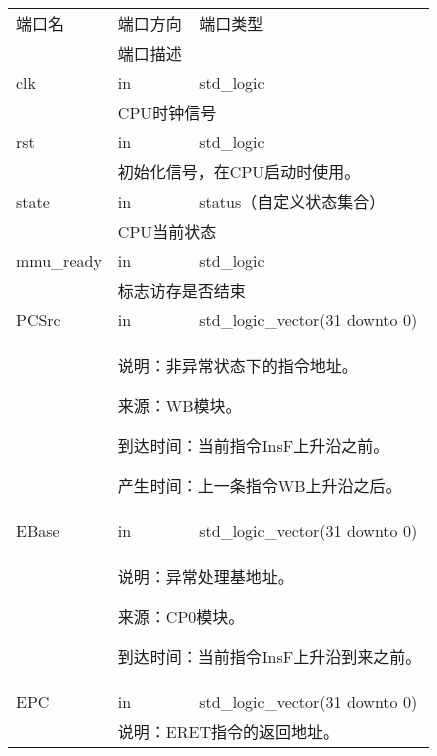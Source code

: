         \begin{tabularx}{\textwidth}{lll}
            \toprule
            端口名          & 端口方向  & 端口类型 \\
            \cmidrule(l){2-3}
            &
            \multicolumn{2}{X}{端口描述} \\
            \midrule
            clk             & in        & std\_logic \\
            \cmidrule(l){2-3}
            &
            \multicolumn{2}{X}{
                CPU时钟信号
            } \\
            \midrule
            rst             & in        & std\_logic \\
            \cmidrule(l){2-3}
            &
            \multicolumn{2}{X}{
                初始化信号，在CPU启动时使用。
            } \\
            \midrule
            state           & in        & status（自定义状态集合） \\
            \cmidrule(l){2-3}
            &
            \multicolumn{2}{X}{
                CPU当前状态
            } \\
            \midrule
            mmu\_ready           & in        & std\_logic \\
            \cmidrule(l){2-3}
            &
            \multicolumn{2}{X}{
                标志访存是否结束
            } \\
            \midrule
            PCSrc           & in        & std\_logic\_vector(31 downto 0) \\
            \cmidrule(l){2-3}
            &
            \multicolumn{2}{X}{
                说明：非异常状态下的指令地址。

                来源：WB模块。

                到达时间：当前指令InsF上升沿之前。

                产生时间：上一条指令WB上升沿之后。
            } \\
            \midrule
            EBase           & in        & std\_logic\_vector(31 downto 0) \\
            \cmidrule(l){2-3}
            &
            \multicolumn{2}{X}{
                说明：异常处理基地址。

                来源：CP0模块。

                到达时间：当前指令InsF上升沿到来之前。
            } \\
            \midrule
            EPC             & in        & std\_logic\_vector(31 downto 0) \\
            \cmidrule(l){2-3}
            &
            \multicolumn{2}{X}{
                说明：ERET指令的返回地址。

}
\end{tabularx}
